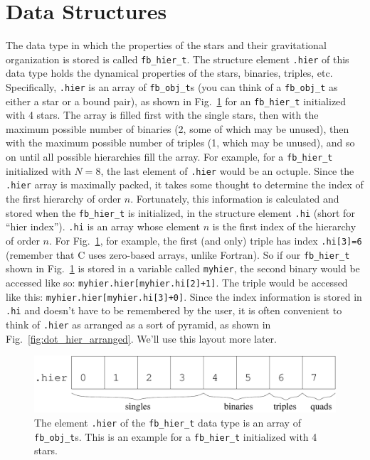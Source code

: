 \documentclass[10pt,preprint]{aastex} %
\begin{document}
\section{Data Structures}\label{sec:datastructures}
The data type in which the properties of the stars and their gravitational organization is 
stored is called {\tt fb\_hier\_t}.  The structure element {\tt .hier} of this data type holds 
the dynamical properties of the stars, binaries, triples, etc.  Specifically, {\tt .hier}
is an array of {\tt fb\_obj\_t}s (you can think of a {\tt fb\_obj\_t} as either a star or a bound
pair), as shown in Fig.\ \ref{fig:dot_hier_flat} for an 
{\tt fb\_hier\_t} initialized with 4 stars.  The array is filled first with the single stars,
then with the maximum possible number of binaries (2, some of which may be unused), then with
the maximum possible number of triples (1, which may be unused), and so on until all possible
hierarchies fill the array.  For example, for a {\tt fb\_hier\_t} initialized with $N=8$,
the last element of {\tt .hier} would be an octuple.  Since the {\tt .hier} array is maximally
packed, it takes some thought to determine the index of the first hierarchy of order $n$.  Fortunately,
this information is calculated and stored when the {\tt fb\_hier\_t} is initialized, in the structure
element {\tt .hi} (short for ``hier index'').  {\tt .hi} is an array whose element $n$ is the first index
of the hierarchy of order $n$.  For Fig.\ \ref{fig:dot_hier_flat}, for example, the first (and only) 
triple has index {\tt .hi[3]=6} (remember that C uses zero-based arrays, unlike Fortran).  So 
if our {\tt fb\_hier\_t} shown in Fig.\ \ref{fig:dot_hier_flat} is stored in a variable called
{\tt myhier}, the second binary would be accessed like so: {\tt myhier.hier[myhier.hi[2]+1]}.  The
triple would be accessed like this: {\tt myhier.hier[myhier.hi[3]+0]}.  Since the index information
is stored in {\tt .hi} and doesn't have to be remembered by the user, it is often convenient to 
think of {\tt .hier} as arranged as a sort of pyramid, as shown in Fig.\ \ref{fig:dot_hier_arranged}.
We'll use this layout more later.

\begin{figure}
  \begin{center}
    \includegraphics[scale=0.3]{dot_hier_flat.pdf}
    \caption{The element {\tt .hier} of the {\tt fb\_hier\_t} data type is an array
      of {\tt fb\_obj\_t}s.  This is an example for a {\tt fb\_hier\_t} initialized
      with 4 stars.\label{fig:dot_hier_flat}}
  \end{center}
\end{figure}
\end{document}
